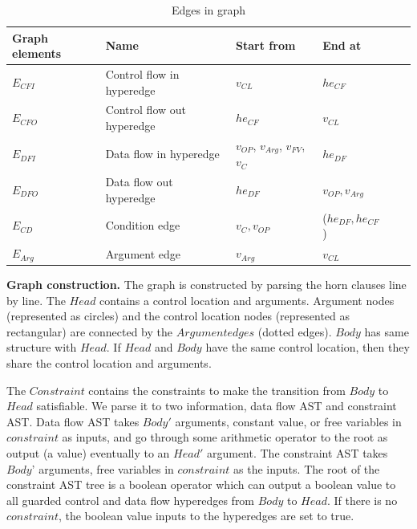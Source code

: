 \documentclass{article}
\begin{document}
\begin{table}\caption{Edges in graph} \label{GraphDescriptionEdges}
\begin{center}
\begin{tabular}{lp{5cm}p{3cm}p{3cm}p{3cm}p{3cm}}
\hline
Graph elements & Name  & Start from & End at \\
\hline
$E_{CFI}$ & Control flow in hyperedge                                               & $v_{CL}$                                  & $he_{CF}$\\
$E_{CFO}$ & Control flow out hyperedge                                               &$he_{CF}$&$v_{CL}$\\
$E_{DFI}$ & Data flow in hyperedge                                                     &$v_{OP}$, $v_{Arg}$, $v_{FV}$, $v_{C}$& $he_{DF}$\\
$E_{DFO}$ & Data flow out hyperedge                                                    &$he_{DF}$ &$v_{OP},v_{Arg}$\\
$E_{CD}$ &  Condition edge                                                       &$v_{C},v_{OP}$&($he_{DF},he_{CF}$)\\
$E_{Arg}$ & Argument edge                                                        &$v_{Arg}$ & $v_{CL}$\\
\hline
\end{tabular}
\end{center}
\end{table}

\textbf{Graph construction.} The graph is constructed by parsing the horn clauses line by line. The $Head$ contains a control location and arguments. Argument nodes (represented as circles) and the control location nodes (represented as rectangular) are connected by the $Argument edges$ (dotted edges).
$Body$ has same structure with $Head$.
If $Head$ and $Body$ have the same control location, then they share the control location and arguments.

The $Constraint$ contains the constraints to make the transition from $Body$ to $Head$ satisfiable. We parse it to two information, data flow AST and constraint AST.  Data flow AST takes $Body'$ arguments, constant value, or free variables in $constraint$ as inputs, and go through some arithmetic operator to the root as output (a value) eventually to an $Head'$ argument. The constraint AST takes $Body$' arguments, free variables in $constraint$ as the inputs. The root of the constraint AST tree is a boolean operator which can output a boolean value to all guarded control and data flow hyperedges from $Body$ to $Head$. If there is no $constraint$, the boolean value inputs to the hyperedges are set to true.
\end{document}
